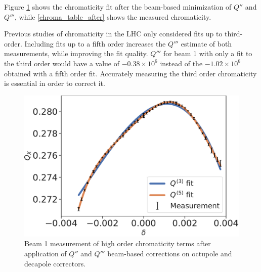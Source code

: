 Figure \ref{chroma_after_correction} shows the chromaticity fit after the beam-based minimization of $Q''$ and $Q'''$,
while \cref{chroma_table_after} shows the measured chromaticity.

Previous studies of chromaticity in the LHC only considered fits up to third-order.
Including fits up to a fifth order increases the $Q'''$ estimate of both measurements, while improving the fit quality. $Q'''$ for beam 1 with only a fit to the third order would have a value of $-0.38 \times 10^6$
instead of the $-1.02 \times 10^6$ obtained with a fifth order fit. 
Accurately measuring the third order chromaticity is essential in order to correct it.

\begin{figure}[tbh]
    \centering
    \includegraphics[width=1\columnwidth]{images/MOPL027_f3-1.pdf}
    \caption{Beam 1 measurement of high order chromaticity terms after application of $Q''$ and $Q'''$ 
             beam-based corrections on octupole and decapole correctors.}
    \label{chroma_after_correction}
\end{figure}

